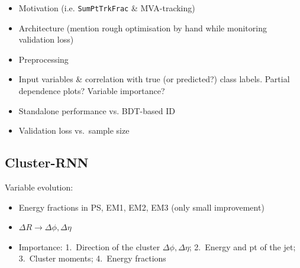 \begin{itemize}
\item Motivation (i.e. \texttt{SumPtTrkFrac} \& MVA-tracking)
\item Architecture (mention rough optimisation by hand while monitoring
  validation loss)
\item Preprocessing
\item Input variables \& correlation with true (or predicted?) class labels.
  Partial dependence plots? Variable importance?
\item Standalone performance vs. BDT-based ID
\end{itemize}

\begin{itemize}
\item Validation loss vs.\ sample size
\end{itemize}

\subsection{Cluster-RNN}
\label{sec:rnn_clusters}



Variable evolution:
\begin{itemize}
\item Energy fractions in PS, EM1, EM2, EM3 (only small improvement)
\item $\Delta R \rightarrow \Delta \phi, \Delta \eta$
\item Importance: 1.\ Direction of the cluster $\Delta \phi, \Delta \eta$; 2.\
  Energy and pt of the jet; 3.\ Cluster moments; 4.\ Energy fractions
\end{itemize}

